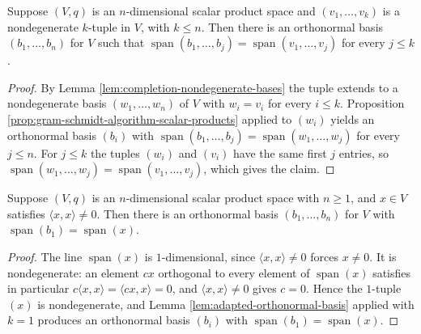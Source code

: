 \begin{lemma}
\label{lem:adapted-orthonormal-basis}
\leanok
{}
Suppose $(V,q)$ is an $n$-dimensional scalar product space and $(v_1,\ldots,v_k)$ is a nondegenerate $k$-tuple in $V$, with $k \leq n$. Then there is an orthonormal basis $(b_1,\ldots,b_n)$ for $V$ such that $\operatorname{span}(b_1,\ldots,b_j) = \operatorname{span}(v_1,\ldots,v_j)$ for every $j \leq k$.
\end{lemma}

\begin{proof}
\leanok
{}
By Lemma \ref{lem:completion-nondegenerate-bases} the tuple extends to a nondegenerate basis $(w_1,\ldots,w_n)$ of $V$ with $w_i = v_i$ for every $i \leq k$. Proposition \ref{prop:gram-schmidt-algorithm-scalar-products} applied to $(w_i)$ yields an orthonormal basis $(b_i)$ with $\operatorname{span}(b_1,\ldots,b_j) = \operatorname{span}(w_1,\ldots,w_j)$ for every $j \leq n$. For $j \leq k$ the tuples $(w_i)$ and $(v_i)$ have the same first $j$ entries, so $\operatorname{span}(w_1,\ldots,w_j) = \operatorname{span}(v_1,\ldots,v_j)$, which gives the claim.
\end{proof}

\begin{lemma}
\label{lem:adapted-orthonormal-basis-line}
\leanok
{}
Suppose $(V,q)$ is an $n$-dimensional scalar product space with $n \geq 1$, and $x \in V$ satisfies $\langle x, x \rangle \neq 0$. Then there is an orthonormal basis $(b_1,\ldots,b_n)$ for $V$ with $\operatorname{span}(b_1) = \operatorname{span}(x)$.
\end{lemma}

\begin{proof}
\leanok
{}
The line $\operatorname{span}(x)$ is $1$-dimensional, since $\langle x,x\rangle \neq 0$ forces $x \neq 0$. It is nondegenerate: an element $cx$ orthogonal to every element of $\operatorname{span}(x)$ satisfies in particular $c\langle x,x \rangle = \langle cx, x\rangle = 0$, and $\langle x,x\rangle \neq 0$ gives $c = 0$. Hence the $1$-tuple $(x)$ is nondegenerate, and Lemma \ref{lem:adapted-orthonormal-basis} applied with $k = 1$ produces an orthonormal basis $(b_i)$ with $\operatorname{span}(b_1) = \operatorname{span}(x)$.
\end{proof}

